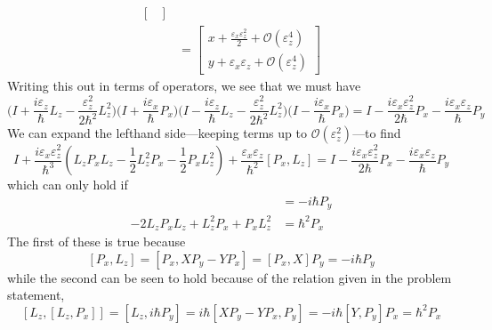 \documentclass[../principles-of-quantum-mechanics.tex]{subfiles}
\begin{document}
\begin{questions}
\begin{solution}
\begin{align*}
\begin{bmatrix}
			\end{bmatrix} \\
			&= \begin{bmatrix}
				x + \frac{\varepsilon_x\varepsilon_z^2}{2} + \mathcal{O}(\varepsilon_z^4)\\
				y + \varepsilon_x\varepsilon_z + \mathcal{O}(\varepsilon_z^4)
			\end{bmatrix}
		\end{align*}
		Writing this out in terms of operators, we see that we must have
		$$\Big(I + \frac{i\varepsilon_z}{\hbar}L_z - \frac{\varepsilon_z^2}{2\hbar^2}L_z^2\Big)\Big(I + \frac{i\varepsilon_x}{\hbar}P_x\Big)\Big(I - \frac{i\varepsilon_z}{\hbar}L_z - \frac{\varepsilon_z^2}{2\hbar^2}L_z^2\Big)\Big(I - \frac{i\varepsilon_x}{\hbar}P_x\Big) = I - \frac{i\varepsilon_x\varepsilon_z^2}{2\hbar}P_x - \frac{i\varepsilon_x\varepsilon_z}{\hbar}P_y$$
		We can expand the lefthand side---keeping terms up to $\mathcal{O}(\varepsilon_z^2)$---to find
		$$I + \frac{i\varepsilon_x\varepsilon_z^2}{\hbar^3}(L_zP_xL_z - \frac{1}{2}L_z^2P_x - \frac{1}{2}P_xL_z^2) + \frac{\varepsilon_x\varepsilon_z}{\hbar^2}[P_x, L_z] = I - \frac{i\varepsilon_x\varepsilon_z^2}{2\hbar}P_x - \frac{i\varepsilon_x\varepsilon_z}{\hbar}P_y$$
		which can only hold if
		\begin{align*}
			[P_x, L_z] &= -i\hbar P_y \\
			-2L_zP_xL_z + L_z^2P_x + P_xL_z^2 &= \hbar^2P_x
		\end{align*}
		The first of these is true because
		$$[P_x, L_z] = [P_x, XP_y - YP_x] = [P_x, X]P_y = -i\hbar P_y$$
		while the second can be seen to hold because of the relation given in the problem statement,
		$$[L_z, [L_z, P_x]] = [L_z, i\hbar P_y] = i\hbar[XP_y - YP_x, P_y] = -i\hbar[Y, P_y]P_x = \hbar^2P_x$$
	\end{solution}
	
	\setcounter{subsection}{2}
	\setcounter{question}{0}

\end{questions}
\end{document}
